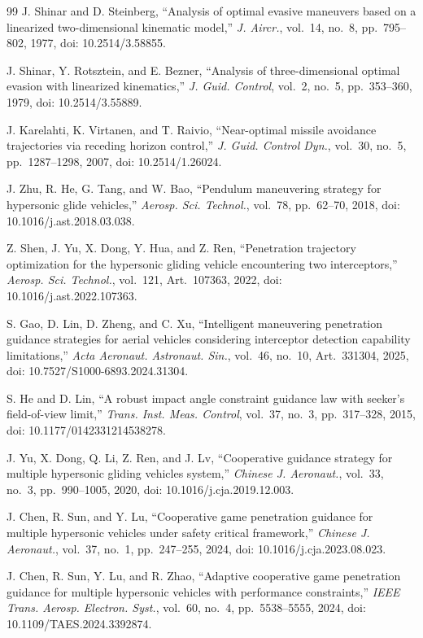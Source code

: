 \begin{thebibliography}{99}
J. Shinar and D. Steinberg, ``Analysis of optimal evasive maneuvers based on a linearized two-dimensional kinematic model,'' \textit{J. Aircr.}, vol.~14, no.~8, pp.~795--802, 1977, doi: 10.2514/3.58855.

J. Shinar, Y. Rotsztein, and E. Bezner, ``Analysis of three-dimensional optimal evasion with linearized kinematics,'' \textit{J. Guid. Control}, vol.~2, no.~5, pp.~353--360, 1979, doi: 10.2514/3.55889.

J. Karelahti, K. Virtanen, and T. Raivio, ``Near-optimal missile avoidance trajectories via receding horizon control,'' \textit{J. Guid. Control Dyn.}, vol.~30, no.~5, pp.~1287--1298, 2007, doi: 10.2514/1.26024.

J. Zhu, R. He, G. Tang, and W. Bao, ``Pendulum maneuvering strategy for hypersonic glide vehicles,'' \textit{Aerosp. Sci. Technol.}, vol.~78, pp.~62--70, 2018, doi: 10.1016/j.ast.2018.03.038.

Z. Shen, J. Yu, X. Dong, Y. Hua, and Z. Ren, ``Penetration trajectory optimization for the hypersonic gliding vehicle encountering two interceptors,'' \textit{Aerosp. Sci. Technol.}, vol.~121, Art.~107363, 2022, doi: 10.1016/j.ast.2022.107363.

S. Gao, D. Lin, D. Zheng, and C. Xu, ``Intelligent maneuvering penetration guidance strategies for aerial vehicles considering interceptor detection capability limitations,'' \textit{Acta Aeronaut. Astronaut. Sin.}, vol.~46, no.~10, Art.~331304, 2025, doi: 10.7527/S1000-6893.2024.31304.

S. He and D. Lin, ``A robust impact angle constraint guidance law with seeker's field-of-view limit,'' \textit{Trans. Inst. Meas. Control}, vol.~37, no.~3, pp.~317--328, 2015, doi: 10.1177/0142331214538278.

J. Yu, X. Dong, Q. Li, Z. Ren, and J. Lv, ``Cooperative guidance strategy for multiple hypersonic gliding vehicles system,'' \textit{Chinese J. Aeronaut.}, vol.~33, no.~3, pp.~990--1005, 2020, doi: 10.1016/j.cja.2019.12.003.

J. Chen, R. Sun, and Y. Lu, ``Cooperative game penetration guidance for multiple hypersonic vehicles under safety critical framework,'' \textit{Chinese J. Aeronaut.}, vol.~37, no.~1, pp.~247--255, 2024, doi: 10.1016/j.cja.2023.08.023.

J. Chen, R. Sun, Y. Lu, and R. Zhao, ``Adaptive cooperative game penetration guidance for multiple hypersonic vehicles with performance constraints,'' \textit{IEEE Trans. Aerosp. Electron. Syst.}, vol.~60, no.~4, pp.~5538--5555, 2024, doi: 10.1109/TAES.2024.3392874.


\end{thebibliography}
